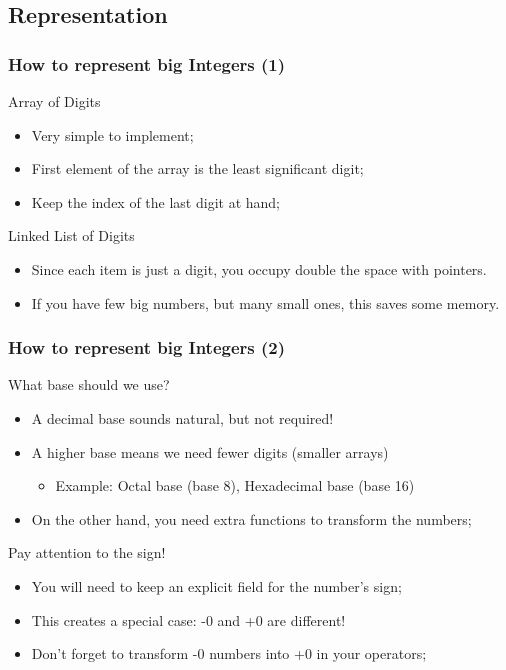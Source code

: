 \documentclass{beamer}
\begin{document}
\subsection{Representation}
\begin{frame}
  \frametitle{How to represent big Integers (1)}

  \begin{block}{Array of Digits}
    \begin{itemize}
    \item Very simple to implement;
    \item First element of the array is the least significant digit;
    \item Keep the index of the last digit at hand;
    \end{itemize}
  \end{block}
  
  \begin{block}{Linked List of Digits}
    \begin{itemize}
    \item Since each item is just a digit, you occupy double the space with pointers.
    \item If you have few big numbers, but many small ones, this saves some memory.
    \end{itemize}
  \end{block}
\end{frame}

\begin{frame}
  \frametitle{How to represent big Integers (2)}
  \begin{block}{What base should we use?}
    \begin{itemize}
    \item A decimal base sounds natural, but not required!
    \item A higher base means we need fewer digits (smaller arrays)
      \begin{itemize}
      \item Example: Octal base (base 8), Hexadecimal base (base 16)
      \end{itemize}
    \item On the other hand, you need extra functions to transform the numbers;
    \end{itemize}
  \end{block}
  
  \begin{block}{Pay attention to the sign!}
    \begin{itemize}
    \item You will need to keep an explicit field for the number's
      sign;
    \item This creates a special case: -0 and +0 are different!
    \item Don't forget to transform -0 numbers into +0 in your operators;
    \end{itemize}
  \end{block}
\end{frame}
\end{document}
